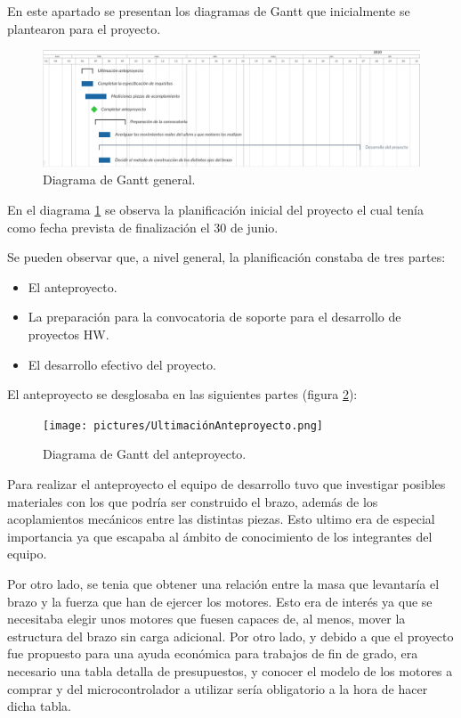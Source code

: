 En este apartado se presentan los diagramas de Gantt que inicialmente se plantearon para el proyecto.

\begin{figure}[H]
    \centering
    \includegraphics[width=\linewidth]{pictures/DiagramaGanttGeneral.png}
    \caption{Diagrama de Gantt general.}
    \label{fig:gantt_general}
\end{figure}

En el diagrama \ref{fig:gantt_general} se observa la planificación inicial del proyecto el cual tenía como fecha prevista de finalización el 30 de junio.

Se pueden observar que, a nivel general, la planificación constaba de tres partes:

\begin{itemize}
    \item El anteproyecto.
    \item La preparación para la convocatoria de soporte para el desarrollo de proyectos \ac{HW}.
    \item El desarrollo efectivo del proyecto.
\end{itemize}

El anteproyecto se desglosaba en las siguientes partes (figura \ref{fig:gantt_anteproyecto}):

\begin{figure}[H]
    \centering
    \texttt{[image: pictures/UltimaciónAnteproyecto.png]}
    \caption{Diagrama de Gantt del anteproyecto.}
    \label{fig:gantt_anteproyecto}
\end{figure}

Para realizar el anteproyecto el equipo de desarrollo tuvo que investigar posibles materiales con los que podría ser construido el brazo, además de los acoplamientos mecánicos entre las distintas piezas. Esto ultimo era de especial importancia ya que escapaba al ámbito de conocimiento de los integrantes del equipo.

Por otro lado, se tenia que obtener una relación entre la masa que levantaría el brazo y la fuerza que han de ejercer los motores. Esto era de interés ya que se necesitaba elegir unos motores que fuesen capaces de, al menos, mover la estructura del brazo sin carga adicional. Por otro lado, y debido a que el proyecto fue propuesto para una ayuda económica para trabajos de fin de grado, era necesario una tabla detalla de presupuestos, y conocer el modelo de los motores a comprar y del microcontrolador a utilizar sería obligatorio a la hora de hacer dicha tabla.

